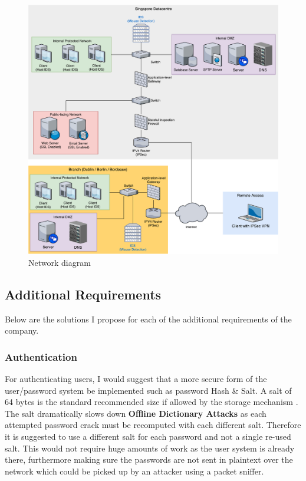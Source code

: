 \documentclass[11pt]{article}
\begin{document}
          \begin{figure}[h]
            \centering
            \includegraphics[width=13cm]{network-diagram.pdf}
            \caption{Network diagram}
            \label{fig:network-diagram}
          \end{figure}

      \subsection{Additional Requirements}
        Below are the solutions I propose for each of the additional requirements of the company.

        \subsubsection{Authentication} \label{auth}
          For authenticating users, I would suggest that a more secure form of the user/password system be implemented such as password Hash \& Salt. A salt of 64 bytes is the standard recommended size if allowed by the storage mechanism \citep{owaspSalt}. The salt dramatically slows down  \textbf{Offline Dictionary Attacks} as each attempted password crack must be recomputed with each different salt. Therefore it is suggested to use a different salt for each password and not a single re-used salt. This would not require huge amounts of work as the user system is already there, furthermore making sure the passwords are not sent in plaintext over the network which could be picked up by an attacker using a packet sniffer.
\end{document}
